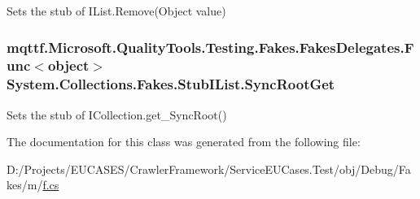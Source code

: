 Sets the stub of I\-List.\-Remove(\-Object value)

\hypertarget{class_system_1_1_collections_1_1_fakes_1_1_stub_i_list_a9b107b2e02005b6fb138ab7f818bd1ff}{
\subsubsection[{Sync\-Root\-Get}]{\setlength{\rightskip}{0pt plus 5cm}mqttf.\-Microsoft.\-Quality\-Tools.\-Testing.\-Fakes.\-Fakes\-Delegates.\-Func$<$object$>$ System.\-Collections.\-Fakes.\-Stub\-I\-List.\-Sync\-Root\-Get}}\label{class_system_1_1_collections_1_1_fakes_1_1_stub_i_list_a9b107b2e02005b6fb138ab7f818bd1ff}


Sets the stub of I\-Collection.\-get\-\_\-\-Sync\-Root()



The documentation for this class was generated from the following file\-:\begin{DoxyCompactItemize}
\item 
D\-:/\-Projects/\-E\-U\-C\-A\-S\-E\-S/\-Crawler\-Framework/\-Service\-E\-U\-Cases.\-Test/obj/\-Debug/\-Fakes/m/\hyperlink{m_2f_8cs}{f.\-cs}\end{DoxyCompactItemize}
